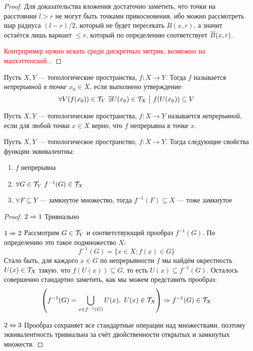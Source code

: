 \begin{proof}
	Для доказательства вложения достаточно заметить, что точки на расстоянии $l > r$ не могут быть точками прикосновения, ибо можно рассмотреть шар радиуса $(l - r) / 2$, который не будет пересекать $B(x, r)$, а значит остаётся лишь вариант $\le r$, который по определению соответствует $\overline{B}(x, r)$.
	
	\textcolor{red}{Контрпример нужно искать среди дискретных метрик, возможно на манхэттенской...}
\end{proof}

\begin{definition}
	Пусть $X, Y$ --- топологические пространства, $f \colon X \to Y$. Тогда $f$ называется \textit{непрерывной в точке $x_0 \in X$}, если выполнено утверждение:
	\[
		\forall V(f(x_0)) \in \mathcal{T}_Y\ \exists U(x_0) \in \mathcal{T}_X \ \big|\  f(U(x_0)) \subseteq V
	\]
\end{definition}

\begin{definition}
	Пусть $X, Y$ --- топологические пространства, $f \colon X \to Y$ называется \textit{непрерывной}, если для любой точки $x \in X$ верно, что $f$ непрерывна в точке $x$.
\end{definition}

\begin{theorem}
	Пусть $X, Y$ --- топологическое пространство, $f \colon X \to Y$. Тогда следующие свойства функции эквивалентны:
	\begin{enumerate}
		\item $f$ непрерывна
		
		\item $\forall G \in \mathcal{T}_Y\ f^{-1}(G) \in \mathcal{T}_X$
		
		\item $\forall F \subseteq Y$ --- замкнутое множество, тогда $f^{-1}(F) \subseteq X$ --- тоже замкнутое
	\end{enumerate}
\end{theorem}

\begin{proof}
	\item $2 \Rightarrow 1$ Тривиально
	
	\item $1 \Rightarrow 2$ Рассмотрим $G \in \mathcal{T}_Y$ и соответствующий прообраз $f^{-1}(G)$. По определению это такое подмножество $X$:
	\[
		f^{-1}(G) = \{x \in X \colon f(x) \in G\}
	\]
	Стало быть, для каждого $x \in G$ по непрерывности $f$ мы найдём окрестность $U(x) \in \mathcal{T}_X$ такую, что $f(U(x)) \subseteq G$, то есть $U(x) \subseteq f^{-1}(G)$. Осталось совершенно стандартно заметить, как мы можем представить прообраз:
	\[
		\left(f^{-1}(G) = \bigcup_{x \in f^{-1}(G)} U(x),\ U(x) \in \mathcal{T}_X\right) \Rightarrow f^{-1}(G) \in \mathcal{T}_X
	\]
	
	\item $2 \Leftrightarrow 3$ Прообраз сохраняет все стандартные операции над множествами, поэтому эквивалентность тривиальна за счёт двойственности открытых и замкнутых множеств.
\end{proof}